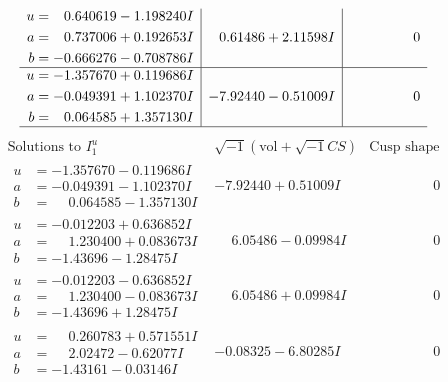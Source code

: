 \documentclass[1p]{elsarticle_modified}
\theoremstyle{definition}
\newcommand{\I}{\sqrt{-1}}
\begin{document}
$$\begin{array}{c|c|c}
\begin{aligned}
u &= \phantom{-}0.640619 - 1.198240 I \\
a &= \phantom{-}0.737006 + 0.192653 I \\
b &= -0.666276 - 0.708786 I\end{aligned}
 & \phantom{-}0.61486 + 2.11598 I & \phantom{-0.000000 } 0 \\ \hline\begin{aligned}
u &= -1.357670 + 0.119686 I \\
a &= -0.049391 + 1.102370 I \\
b &= \phantom{-}0.064585 + 1.357130 I\end{aligned}
 & -7.92440 - 0.51009 I & \phantom{-0.000000 } 0\\
 \hline 
 \end{array}$$\newpage$$\begin{array}{c|c|c}  
\text{Solutions to }I^u_{1}& \I (\text{vol} + \sqrt{-1}CS) & \text{Cusp shape}\\
 \hline 
\begin{aligned}
u &= -1.357670 - 0.119686 I \\
a &= -0.049391 - 1.102370 I \\
b &= \phantom{-}0.064585 - 1.357130 I\end{aligned}
 & -7.92440 + 0.51009 I & \phantom{-0.000000 } 0 \\ \hline\begin{aligned}
u &= -0.012203 + 0.636852 I \\
a &= \phantom{-}1.230400 + 0.083673 I \\
b &= -1.43696 - 1.28475 I\end{aligned}
 & \phantom{-}6.05486 - 0.09984 I & \phantom{-0.000000 } 0 \\ \hline\begin{aligned}
u &= -0.012203 - 0.636852 I \\
a &= \phantom{-}1.230400 - 0.083673 I \\
b &= -1.43696 + 1.28475 I\end{aligned}
 & \phantom{-}6.05486 + 0.09984 I & \phantom{-0.000000 } 0 \\ \hline\begin{aligned}
u &= \phantom{-}0.260783 + 0.571551 I \\
a &= \phantom{-}2.02472 - 0.62077 I \\
b &= -1.43161 - 0.03146 I\end{aligned}
 & -0.08325 - 6.80285 I & \phantom{-0.000000 } 0 \\ \hline\begin{aligned}

\end{aligned}
\end{array}$$
\end{document}
